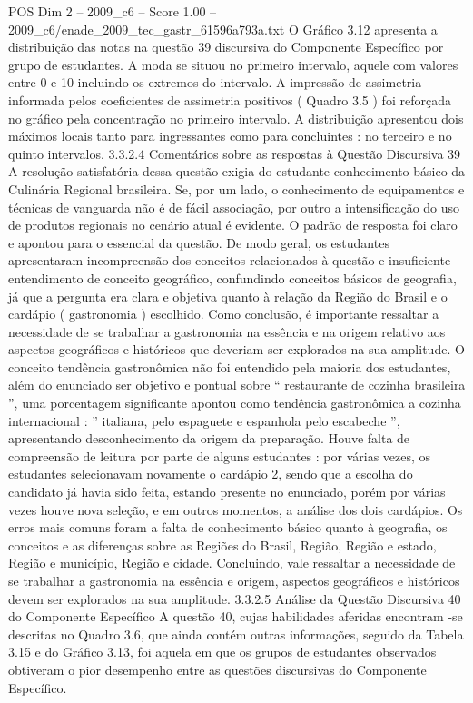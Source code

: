 \begin{textsample}{POS Dim 2 – 2009\_c6 – Score 1.00 – 2009\_c6/enade\_2009\_tec\_gastr\_61596a793a.txt}
O Gráfico 3.12 apresenta a distribuição das notas na questão 39 discursiva do Componente Específico por grupo de estudantes.
A moda se situou no primeiro intervalo, aquele com valores entre 0 e 10 incluindo os extremos do intervalo.
A impressão de assimetria informada pelos coeficientes de assimetria positivos ( Quadro 3.5 ) foi reforçada no gráfico pela concentração no primeiro intervalo.
A distribuição apresentou dois máximos locais tanto para ingressantes como para concluintes : no terceiro e no quinto intervalos. 3.3.2.4 Comentários sobre as respostas à Questão Discursiva 39 A resolução satisfatória dessa questão exigia do estudante conhecimento básico da Culinária Regional brasileira.
Se, por um lado, o conhecimento de equipamentos e técnicas de vanguarda não é de fácil associação, por outro a intensificação do uso de produtos regionais no cenário atual é evidente.
O padrão de resposta foi claro e apontou para o essencial da questão.
De modo geral, os estudantes apresentaram incompreensão dos conceitos relacionados à questão e insuficiente entendimento de conceito geográfico, confundindo conceitos básicos de geografia, já que a pergunta era clara e objetiva quanto à relação da Região do Brasil e o cardápio ( gastronomia ) escolhido.
Como conclusão, é importante ressaltar a necessidade de se trabalhar a gastronomia na essência e na origem relativo aos aspectos geográficos e históricos que deveriam ser explorados na sua amplitude.
O conceito tendência gastronômica não foi entendido pela maioria dos estudantes, além do enunciado ser objetivo e pontual sobre “ restaurante de cozinha brasileira ”, uma porcentagem significante apontou como tendência gastronômica a cozinha internacional : ” italiana, pelo espaguete e espanhola pelo escabeche ”, apresentando desconhecimento da origem da preparação.
Houve falta de compreensão de leitura por parte de alguns estudantes : por várias vezes, os estudantes selecionavam novamente o cardápio 2, sendo que a escolha do candidato já havia sido feita, estando presente no enunciado, porém por várias vezes houve nova seleção, e em outros momentos, a análise dos dois cardápios.
Os erros mais comuns foram a falta de conhecimento básico quanto à geografia, os conceitos e as diferenças sobre as Regiões do Brasil, Região, Região e estado, Região e município, Região e cidade.
Concluindo, vale ressaltar a necessidade de se trabalhar a gastronomia na essência e origem, aspectos geográficos e históricos devem ser explorados na sua amplitude. 3.3.2.5 Análise da Questão Discursiva 40 do Componente Específico A questão 40, cujas habilidades aferidas encontram -se descritas no Quadro 3.6, que ainda contém outras informações, seguido da Tabela 3.15 e do Gráfico 3.13, foi aquela em que os grupos de estudantes observados obtiveram o pior desempenho entre as questões discursivas do Componente Específico.

\end{textsample}
